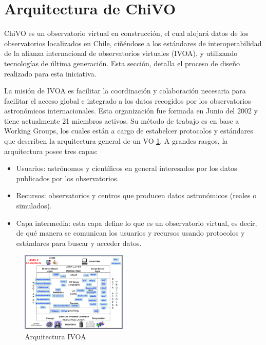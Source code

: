 \section{Arquitectura de ChiVO}

ChiVO es un observatorio virtual en construcción, el cual alojará datos de los
observatorios localizados en Chile, ciñéndose a los estándares de
interoperabilidad de la alianza internacional de observatorios virtuales (IVOA),
y utilizando tecnologías de última generación. Esta sección, detalla el
proceso de diseño realizado para esta iniciativa.

La misión de IVOA es facilitar la coordinación y colaboración necesaria para
facilitar el acceso global e integrado a los datos recogidos por los
observatorios astronómicos internacionales. Esta organización fue formada en
Junio del 2002 y tiene actualmente 21 miembros activos. Su método de trabajo es
en base a Working Groups, los cuales están a cargo de estabelcer protocolos y
estándares que describen la arquitectura general de un VO \ref{fig:ivoavacio}.
A grandes rasgos, la arquitectura posee tres capas:
\begin{itemize}
    \item Usuarios: astrónomos y científicos en general interesados por los
    datos publicados por los observatorios.
    \item Recursos: observatorios y centros que producen datos astronómicos
    (reales o simulados).
    \item Capa intermedia: esta capa define lo que es un observatorio virtual,
    es decir, de qué manera se comunican los usuarios y recursos usando
    protocolos y estándares para buscar y acceder datos.
\end{itemize}

\begin{figure}[ht]
    \centering
    \includegraphics[width=0.45\textwidth]{images/ivoavacio.png}
    \caption{Arquitectura IVOA}
    \label{fig:ivoavacio}
\end{figure}

